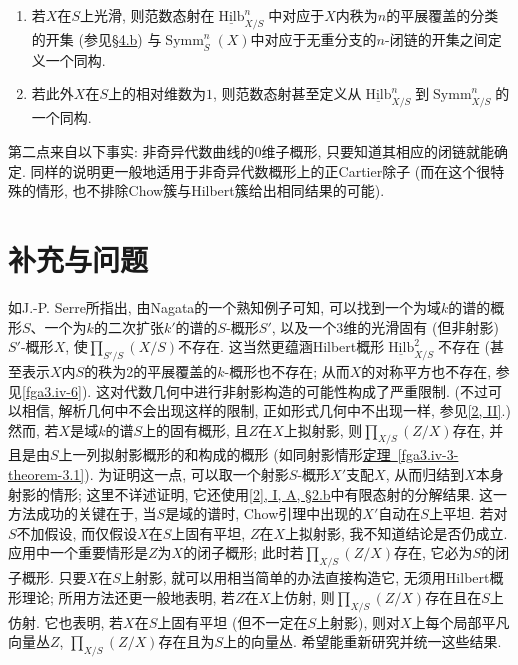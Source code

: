 \begin{enumerate}
    
 \item[a.]若\(X\)在\(S\)上光滑, 则范数态射在\(\underline {\operatorname {Hilb}}_{X/S}^n\)中对应于\(X\)内秩为\(n\)的平展覆盖的分类的开集 (参见\hyperref[fga3.iv-4.b]{§4.b}) 与\(\operatorname {Symm}_S^n(X)\)中对应于无重分支的\(n\)-闭链的开集之间定义一个同构.

    
 \item[b.]若此外\(X\)在\(S\)上的相对维数为\(1\), 则范数态射甚至定义从\(\underline {\operatorname {Hilb}}_{X/S}^n\)到\(\operatorname {Symm}_{X/S}^n\)的一个同构.

  
\end{enumerate} 第二点来自以下事实: 非奇异代数曲线的\(0\)维子概形, 只要知道其相应的闭链就能确定. 同样的说明更一般地适用于非奇异代数概形上的正Cartier除子 (而在这个很特殊的情形, 也不排除Chow簇与Hilbert簇给出相同结果的可能).
\chapter{补充与问题}\thispagestyle{fancy}\label{fga3.iv-7}
\par{}如J.-P. Serre所指出, 由Nagata的一个熟知例子可知, 可以找到一个为域\(k\)的谱的概形\(S\)、一个为\(k\)的二次扩张\(k'\)的谱的\(S\)-概形\(S'\), 以及一个\(3\)维的光滑固有 (但非射影) \(S'\)-概形\(X\), 使\(\prod _{S'/S}(X/S)\)不存在. 这当然更蕴涵Hilbert概形\(\underline {\operatorname {Hilb}}_{X/S}^2\)不存在 (甚至表示\(X\)内\(S\)的秩为\(2\)的平展覆盖的\(k\)-概形也不存在; 从而\(X\)的对称平方也不存在, 参见\cref{fga3.iv-6}). 这对代数几何中进行非射影构造的可能性构成了严重限制. (不过可以相信, 解析几何中不会出现这样的限制, 正如形式几何中不出现一样, 参见\hyperref[fga3.ii]{[2, II]}.) 然而, 若\(X\)是域\(k\)的谱\(S\)上的固有概形, 且\(Z\)在\(X\)上拟射影, 则\(\prod _{X/S}(Z/X)\)存在, 并且是由\(S\)上一列拟射影概形的和构成的概形 (如同射影情形\hyperref[fga3.iv-3-theorem-3.1]{定理~\ref*{fga3.iv-3-theorem-3.1}}). 为证明这一点, 可以取一个射影\(S\)-概形\(X'\)支配\(X\), 从而归结到\(X\)本身射影的情形; 这里不详述证明, 它还使用\hyperref[fga3.i-a.2.b]{[2], I, A, §2.b}中有限态射的分解结果. 这一方法成功的关键在于, 当\(S\)是域的谱时, Chow引理中出现的\(X'\)自动在\(S\)上平坦. 若对\(S\)不加假设, 而仅假设\(X\)在\(S\)上固有平坦, \(Z\)在\(X\)上拟射影, 我不知道结论是否仍成立. 应用中一个重要情形是\(Z\)为\(X\)的闭子概形; 此时若\(\prod _{X/S}(Z/X)\)存在, 它必为\(S\)的闭子概形. 只要\(X\)在\(S\)上射影, 就可以用相当简单的办法直接构造它, 无须用Hilbert概形理论; 所用方法还更一般地表明, 若\(Z\)在\(X\)上仿射, 则\(\prod _{X/S}(Z/X)\)存在且在\(S\)上仿射. 它也表明, 若\(X\)在\(S\)上固有平坦 (但不一定在\(S\)上射影), 则对\(X\)上每个局部平凡向量丛\(Z\), \(\prod _{X/S}(Z/X)\)存在且为\(S\)上的向量丛. 希望能重新研究并统一这些结果.

